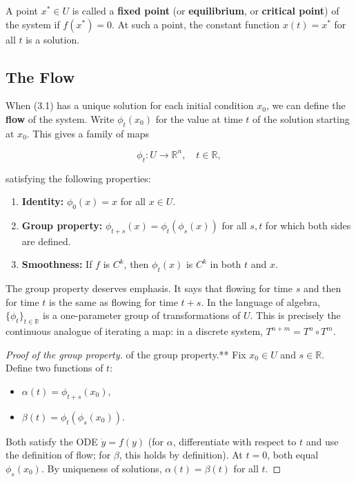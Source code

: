A point $x^* \in U$ is called a \textbf{fixed point} (or \textbf{equilibrium}, or \textbf{critical point}) of the system if $f(x^*) = 0$. At such a point, the constant function $x(t) = x^*$ for all $t$ is a solution.

\subsection{The Flow}\label{sec:3.1.2}

When (3.1) has a unique solution for each initial condition $x_0$, we can define the \textbf{flow} of the system. Write $\phi_t(x_0)$ for the value at time $t$ of the solution starting at $x_0$. This gives a family of maps

\[
\phi_t: U \to \mathbb{R}^n, \quad t \in \mathbb{R},
\]

satisfying the following properties:

\begin{enumerate}[nosep]
  \item \textbf{Identity:} $\phi_0(x) = x$ for all $x \in U$.
  \item \textbf{Group property:} $\phi_{t+s}(x) = \phi_t(\phi_s(x))$ for all $s, t$ for which both sides are defined.
  \item \textbf{Smoothness:} If $f$ is $C^k$, then $\phi_t(x)$ is $C^k$ in both $t$ and $x$.
\end{enumerate}

The group property deserves emphasis. It says that flowing for time $s$ and then for time $t$ is the same as flowing for time $t + s$. In the language of algebra, $\{\phi_t\}_{t \in \mathbb{R}}$ is a one-parameter group of transformations of $U$. This is precisely the continuous analogue of iterating a map: in a discrete system, $T^{n+m} = T^n \circ T^m$.

\begin{proof}[Proof of the group property]
of the group property.** Fix $x_0 \in U$ and $s \in \mathbb{R}$. Define two functions of $t$:

\begin{itemize}[nosep]
  \item $\alpha(t) = \phi_{t+s}(x_0)$,
  \item $\beta(t) = \phi_t(\phi_s(x_0))$.
\end{itemize}

Both satisfy the ODE $\dot{y} = f(y)$ (for $\alpha$, differentiate with respect to $t$ and use the definition of flow; for $\beta$, this holds by definition). At $t = 0$, both equal $\phi_s(x_0)$. By uniqueness of solutions, $\alpha(t) = \beta(t)$ for all $t$.
\end{proof}


